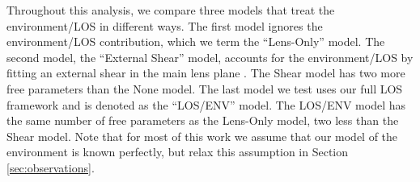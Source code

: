 Throughout this analysis, we compare three models that treat the environment/LOS in different ways. The first model ignores the environment/LOS contribution, which we term the ``Lens-Only'' model. The second model, the ``External Shear'' model, accounts for the environment/LOS by fitting an external shear in the main lens plane \citep[e.g.,][]{Suyu13}. The Shear model has two more free parameters than the None model. The last model we test uses our full LOS framework and is denoted as the ``LOS/ENV'' model. The LOS/ENV model has the same number of free parameters as the Lens-Only model, two less than the Shear model. Note that for most of this work we assume that our model of the environment is known perfectly, but relax this assumption in Section \ref{sec:observations}.
  